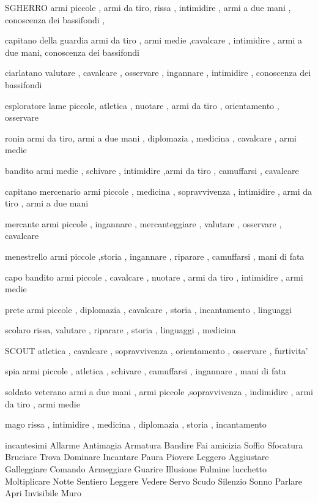 \documentclass[12pt,a4paper,twoside,openany,twocolumn]{book}
\begin{document}
SGHERRO
armi piccole , armi da tiro, rissa , intimidire , armi a due mani , conoscenza dei bassifondi ,

capitano della guardia
armi da tiro , armi medie ,cavalcare , intimidire , armi a due mani, conoscenza dei bassifondi 

ciarlatano
valutare , cavalcare , osservare , ingannare , intimidire , conoscenza dei bassifondi 

esploratore
lame piccole, atletica ,  nuotare , armi da tiro , orientamento , osservare 

ronin
armi da tiro, armi a due mani , diplomazia , medicina , cavalcare , armi medie 

bandito
armi medie , schivare , intimidire ,armi da tiro  , camuffarsi , cavalcare 

capitano mercenario
armi piccole , medicina , sopravvivenza , intimidire , armi da tiro , armi a due mani 

mercante
armi piccole , ingannare , mercanteggiare , valutare , osservare , cavalcare 

menestrello
armi piccole ,storia , ingannare , riparare , camuffarsi ,  mani di fata 

capo bandito
armi piccole , cavalcare , nuotare , armi da tiro , intimidire , armi medie 

prete
armi piccole , diplomazia , cavalcare ,  storia , incantamento , linguaggi 

scolaro
rissa, valutare  , riparare , storia , linguaggi , medicina 

SCOUT
atletica , cavalcare , sopravvivenza , orientamento , osservare , furtivita' 

spia
armi piccole , atletica , schivare ,  camuffarsi , ingannare , mani di fata 

soldato veterano
armi a due mani , armi piccole  ,sopravvivenza , indimidire , armi da tiro , armi medie 

mago
rissa , intimidire , medicina , diplomazia , storia , incantamento 


incantesimi
Allarme
Antimagia
Armatura
Bandire
Fai amicizia
Soffio
Sfocatura
Bruciare
Trova
Dominare
Incantare
Paura
Piovere
Leggero
Aggiustare
Galleggiare
Comando
Armeggiare
Guarire
Illusione
Fulmine
lucchetto
Moltiplicare
Notte
Sentiero
Leggere
Vedere
Servo
Scudo
Silenzio
Sonno
Parlare
Apri
Invisibile
Muro
\end{document}
